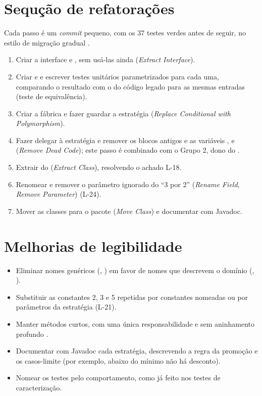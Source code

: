 \section{Sequ\c{c}\~ao de refatora\c{c}\~oes}
Cada passo \'e um \textit{commit} pequeno, com os 37 testes verdes antes de seguir, no estilo de migra\c{c}\~ao gradual \cite{feathers2013}.
\begin{enumerate}
\item Criar a interface  e , sem us\'a-las ainda (\textit{Extract Interface}).
\item Criar  e  e escrever testes unit\'arios parametrizados para cada uma, comparando o resultado com o do c\'odigo legado para as mesmas entradas (teste de equival\^encia).
\item Criar a f\'abrica  e fazer  guardar a estrat\'egia (\textit{Replace Conditional with Polymorphism}).
\item Fazer  delegar \`a estrat\'egia e remover os blocos  antigos e as vari\'aveis ,  e  (\textit{Remove Dead Code}); este passo \'e combinado com o Grupo 2, dono do .
\item Extrair  do  (\textit{Extract Class}), resolvendo o achado L-18.
\item Renomear  e remover o par\^ametro ignorado do ``3 por 2'' (\textit{Rename Field}, \textit{Remove Parameter}) (L-24).
\item Mover as classes para o pacote  (\textit{Move Class}) e documentar com Javadoc.
\end{enumerate}

\section{Melhorias de legibilidade}
\begin{itemize}
\item Eliminar nomes gen\'ericos (, ) em favor de nomes que descrevem o dom\'inio (, ).
\item Substituir as constantes 2, 3 e 5 repetidas por constantes nomeadas ou por par\^ametros da estrat\'egia (L-21).
\item Manter m\'etodos curtos, com uma \'unica responsabilidade e sem aninhamento profundo \cite{martin2011}.
\item Documentar com Javadoc cada estrat\'egia, descrevendo a regra da promo\c{c}\~ao e os casos-limite (por exemplo, abaixo do m\'inimo n\~ao h\'a desconto).
\item Nomear os testes pelo comportamento, como j\'a feito nos testes de caracteriza\c{c}\~ao.
\end{itemize}

